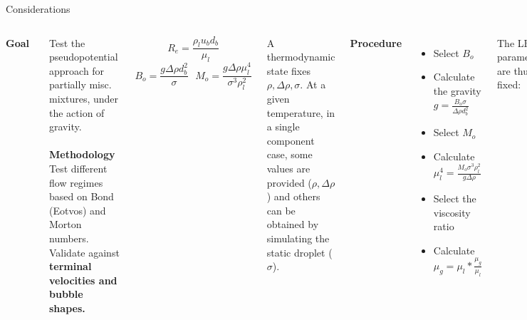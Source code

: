\documentclass[8pt]{beamer}
\begin{document}
	\begin{frame}[t]{Considerations}
		\justifying
		
		\begin{columns}[T]
			
			\textbf{Goal}~\\
			\justifying
			
			Test the pseudopotential approach for partially misc. mixtures, under the action of gravity.\\~\\
			
			\textbf{Methodology}~\\
			Test different flow regimes based on Bond (Eotvos) and Morton numbers. Validate against \textbf{terminal velocities and bubble shapes.}
			
			\begin{equation*}
				R_e = \frac{\rho_l u_b d_b}{\mu_l}
			\end{equation*}
			\begin{equation*}
				B_o = \frac{g \Delta \rho d_b^2}{\sigma} \,\,\,\, 	M_o = \frac{g \Delta \rho \mu_l^4}{\sigma^3 
					\rho_l^2}
			\end{equation*}
			
			
			A thermodynamic state fixes $\rho, \Delta \rho, \sigma$. At a given temperature, in a single component case, some values are provided ($\rho, \Delta \rho$) and others can be obtained by simulating the static droplet ($\sigma$). \\
			
			
			\textbf{Procedure}	
			\begin{itemize}
				\item Select $B_o$
				\item Calculate the gravity $g = \frac{B_o \sigma}{\Delta \rho d_b^2}$
				\item Select $M_o$
				\item Calculate $\mu_l^4 = \frac{M_o \sigma^3 \rho_l^2}{g \Delta \rho }$
				\item Select the viscosity ratio
				\item Calculate $\mu_g = \mu_l * \frac{\mu_g}{\mu_l}$
			\end{itemize}
			
			The LBM parameters are thus fixed:
			
			\begin{equation*}
				\begin{split}
					\tau = \frac{\nu}{c_s^2}+ \frac{\Delta t}{2}
				\end{split}
			\end{equation*}
			
			\textbf{Try single component and then the multicomponent case.}
		\end{columns}
	\end{frame}
	
\end{document}
